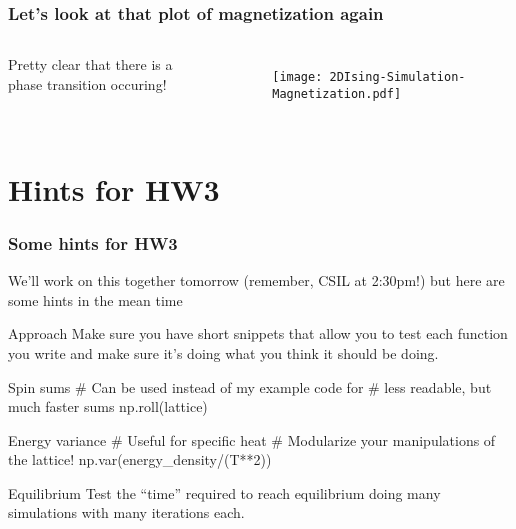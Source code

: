 \documentclass[hyperref={colorlinks=true}]{beamer}
\begin{document}

\begin{frame}%
  \frametitle{Let's look at that plot of magnetization again}

  \begin{columns}
  
 
  Pretty clear that there is a phase transition occuring!
  
  \vspace{0.5cm}
  
  
  \begin{figure}
    \texttt{[image: 2DIsing-Simulation-Magnetization.pdf]}
  \end{figure}
  \end{columns}

  
\end{frame}

\section[Hints for HW3]{Hints for HW3}

\begin{frame}[fragile,shrink=15]
  \frametitle{Some hints for HW3}

  We'll work on this together tomorrow (remember, CSIL at 2:30pm!) but here are some hints in the mean time
  
  \vspace{0.3cm}
  
  \begin{ucblock}{Approach}
    Make sure you have short snippets that allow you to test each function you write and make sure it's doing what you think it should be doing. 
  \end{ucblock}
  
  \begin{ucpythonblock}{Spin sums}
     # Can be used instead of my example code for 
     # less readable, but much faster sums
     np.roll(lattice) 
  \end{ucpythonblock}
  
  \begin{ucpythonblock}{Energy variance}
     # Useful for specific heat 
     # Modularize your manipulations of the lattice!
     np.var(energy_density/(T**2))
  \end{ucpythonblock}
  
  \begin{ucblock}{Equilibrium}
    Test the ``time'' required to reach equilibrium  doing many simulations with many iterations each.
  \end{ucblock}
  
\end{frame}
\end{document}
